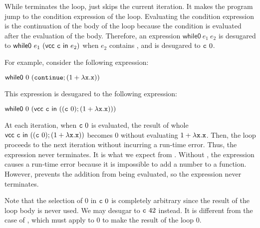 While  terminates the loop,  just skips the current
iteration. It makes the program jump to the condition expression of the loop.
Evaluating the condition expression is the continuation of the body of the loop
because the condition is evaluated after the evaluation of the
body. Therefore, an expression $\textsf{while0}\ e_1\ e_2$ is desugared to
$\textsf{while0}\ e_1\ (\evcc{\code{c}}{e_2})$ when $e_2$ contains
, and  is desugared to $\code{c}\ 0$.

For example, consider the following expression:

$\textsf{while0}\ 0\ (\code{continue};(1+\efun{\cx}{\cx}))$

This expression is desugared to the following expression:

$\textsf{while0}\ 0\ (\evcc{\code{c}}{((\code{c}\ 0);(1+\efun{\cx}{\cx}))})$

At each iteration, when $\code{c}\ 0$ is evaluated,
the result of whole $\evcc{\code{c}}{((\code{c}\ 0);(1+\efun{\cx}{\cx}))}$ becomes
$0$ without evaluating $1+\lambda\texttt{x}.\texttt{x}$. Then, the loop proceeds to the
next iteration without incurring a run-time error. Thus, the expression never
terminates. It is what we expect from . Without ,
the expression causes a run-time error because it is impossible to add a number to
a function. However,  prevents the addition from being evaluated,
so the expression never terminates.

Note that the selection of $0$ in $\code{c}\ 0$ is completely arbitrary
since the result of the loop body is
never used. We may desugar  to $\texttt{c}\ 42$ instead. It is
different from the case of , which must apply  to $0$ to
make the result of the loop $0$.
